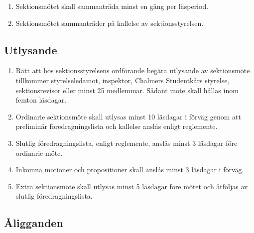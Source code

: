 \documentclass[11pt,a4paper]{article}
\begin{document}
\begin{enumerate}[\thesubsection .1]

  \item Sektionsmötet skall sammanträda minst en gång per läsperiod.

  \item Sektionsmötet sammanträder på kallelse av sektionsstyrelsen.

\end{enumerate}

\subsection{Utlysande}

\begin{enumerate}[\thesubsection .1]

  \label{subsec:utlysande}

  \item Rätt att hos sektionsstyrelsens ordförande begära utlysande av
  sek\-tions\-möte tillkommer styrelseledamot, inspektor,  Chalmers Studentkårs styrelse, sek\-ti\-ons\-revisor  eller minst 25 medlemmar. Sådant möte skall hållas inom femton läsdagar.

  \item Ordinarie sektionsmöte skall utlysas minst 10 läsdagar i
  förväg genom att preliminär föredragningslista och kallelse an\-slås enligt
  reglemente. 
  
  \item Slutlig föredragningslista, enligt reglemente, anslås minst 3 läsdagar före ordinarie möte. 
  
  \item Inkomna motioner och propositioner skall anslås
  minst 3 läsdagar i förväg.
  

  \item Extra sektionsmöte skall utlysas minst 5 läsdagar före mötet
  och åt\-följ\-as av slutlig föredragningslista.

\end{enumerate}

\subsection{Åligganden}
\end{document}
